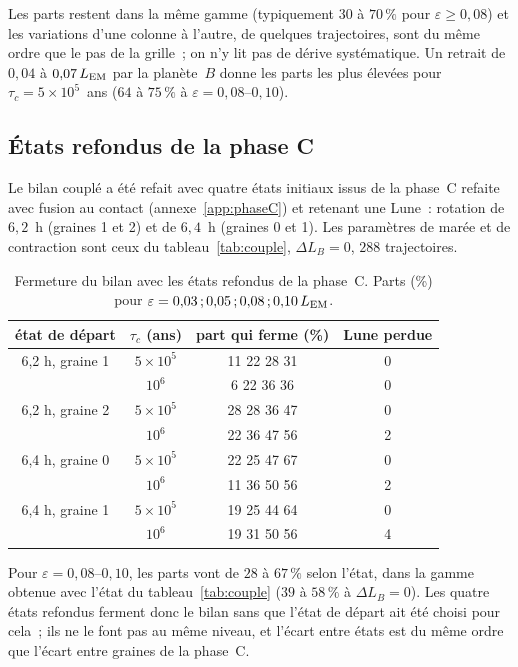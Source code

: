 \documentclass[11pt,a4paper]{article}
\newcommand{\LEM}{\ensuremath{L_{\rm EM}}}
\begin{document}
Les parts restent dans la même gamme (typiquement $30$ à $70\,\%$ pour $\varepsilon\ge0{,}08$) et les variations d'une colonne à l'autre, de quelques trajectoires, sont du même ordre que le pas de la grille~; on n'y lit pas de dérive systématique. Un retrait de $0{,}04$ à $0{,}07\,\LEM$ par la planète~$B$ donne les parts les plus élevées pour $\tau_c=5\times10^5$~ans ($64$ à $75\,\%$ à $\varepsilon=0{,}08$--$0{,}10$).

\subsection{États refondus de la phase C}

Le bilan couplé a été refait avec quatre états initiaux issus de la phase~C refaite avec fusion au contact (annexe~\ref{app:phaseC}) et retenant une Lune~: rotation de $6{,}2$~h (graines 1 et 2) et de $6{,}4$~h (graines 0 et 1). Les paramètres de marée et de contraction sont ceux du tableau~\ref{tab:couple}, $\Delta L_B=0$, $288$ trajectoires.

\begin{table}[htbp]
\centering\footnotesize\setlength{\tabcolsep}{4pt}
\caption{Fermeture du bilan avec les états refondus de la phase~C. Parts (\%) pour $\varepsilon=0{,}03\,;0{,}05\,;0{,}08\,;0{,}10\,\LEM$.\label{tab:refondu}}
\begin{tabular}{cccc}\toprule état de départ & $\tau_c$ (ans) & part qui ferme (\%) & Lune perdue\\\midrule
6,2 h, graine 1 & $5\times10^5$ & 11 22 28 31 & 0\\ & $10^6$ & 6 22 36 36 & 0\\
6,2 h, graine 2 & $5\times10^5$ & 28 28 36 47 & 0\\ & $10^6$ & 22 36 47 56 & 2\\
6,4 h, graine 0 & $5\times10^5$ & 22 25 47 67 & 0\\ & $10^6$ & 11 36 50 56 & 2\\
6,4 h, graine 1 & $5\times10^5$ & 19 25 44 64 & 0\\ & $10^6$ & 19 31 50 56 & 4\\\bottomrule\end{tabular}
\end{table}

Pour $\varepsilon=0{,}08$--$0{,}10$, les parts vont de $28$ à $67\,\%$ selon l'état, dans la gamme obtenue avec l'état du tableau~\ref{tab:couple} ($39$ à $58\,\%$ à $\Delta L_B=0$). Les quatre états refondus ferment donc le bilan sans que l'état de départ ait été choisi pour cela~; ils ne le font pas au même niveau, et l'écart entre états est du même ordre que l'écart entre graines de la phase~C.
\end{document}
